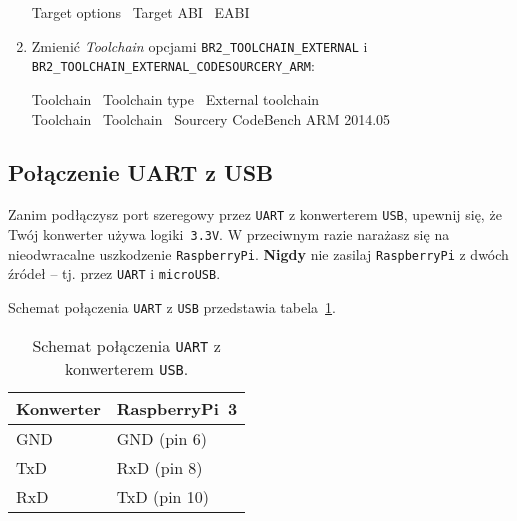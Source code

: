 \documentclass{article}
\newenvironment{ttblock}{\ttfamily}{\par}
\begin{document}
\begin{enumerate}
	\begin{ttblock}
	Target options \textrightarrow\ Target ABI \textrightarrow\ EABI
	\end{ttblock}

	\item Zmienić \emph{Toolchain} opcjami \texttt{BR2\_TOOLCHAIN\_EXTERNAL} i\\ \texttt{BR2\_TOOLCHAIN\_EXTERNAL\_CODESOURCERY\_ARM}:

	\begin{ttblock}
	Toolchain \textrightarrow\ Toolchain type \textrightarrow\ External toolchain\\
	Toolchain \textrightarrow\ Toolchain \textrightarrow\ Sourcery CodeBench ARM 2014.05
	\end{ttblock}

\end{enumerate}


\subsection{Połączenie UART z USB}

Zanim podłączysz port szeregowy przez \texttt{UART} z konwerterem \texttt{USB}, upewnij się, że Twój konwerter używa logiki~\texttt{3.3V}. W przeciwnym razie narażasz się na nieodwracalne uszkodzenie \texttt{RaspberryPi}. \textbf{Nigdy} nie zasilaj \texttt{RaspberryPi} z dwóch źródeł -- tj. przez \texttt{UART} i \texttt{microUSB}.

Schemat połączenia \texttt{UART} z \texttt{USB} przedstawia tabela~\ref{tab:schemat-uart}.
\begin{table}[!h]
\renewcommand{\familydefault}{\ttdefault}\normalfont
\centering
\begin{tabular}{l|l}
Konwerter & RaspberryPi~3\\
\hline\hline
GND & GND (pin 6)\\
\hline
TxD & RxD (pin 8)\\
\hline
RxD & TxD (pin 10)\\
\end{tabular}
\caption{Schemat połączenia \texttt{UART} z konwerterem \texttt{USB}.}
\label{tab:schemat-uart}
\end{table}
\end{document}

